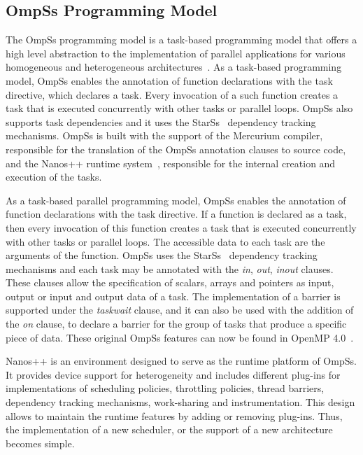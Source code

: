 {\subsection{OmpSs Programming Model}
The OmpSs programming model is a task-based programming model that offers a high level abstraction to the implementation of parallel applications for various homogeneous and heterogeneous architectures~\cite{OmpSs_PPL11,OmpSs}. 
As a task-based programming model, OmpSs enables the annotation of function declarations with the task directive, which declares a task. 
Every invocation of a such function creates a task that is executed concurrently with other tasks or parallel loops. 
OmpSs also supports task dependencies and it uses the StarSs~\cite{StarSs} dependency tracking mechanisms. 
OmpSs is built with the support of the Mercurium compiler, responsible for the translation of the OmpSs annotation clauses to source code, and the Nanos++ runtime system~\cite{nanos}, responsible for the internal creation and execution of the tasks.

As a task-based parallel programming model, OmpSs enables the annotation of function declarations with the task directive. 
If a function is declared as a task, then every invocation of this function creates a task that is executed concurrently with other tasks or parallel loops. 
The accessible data to each task are the arguments of the function. 
OmpSs uses the StarSs~\cite{StarSs} dependency tracking mechanisms and each task may be annotated with the \textit{in}, \textit{out}, \textit{inout} clauses. 
These clauses allow the specification of scalars, arrays and pointers as input, output or input and output data of a task. 
The implementation of a barrier is supported under the \textit{taskwait} clause, and it can also be used with the addition of the \textit{on} clause, to declare a barrier for the group of tasks that produce a specific piece of data. 
These original OmpSs features can now be found in OpenMP 4.0~\cite{OpenMP}.

Nanos++ is an environment designed to serve as the runtime platform of OmpSs. 
It provides device support for heterogeneity and includes different plug-ins for implementations of scheduling policies, throttling policies, thread barriers, dependency tracking mechanisms, work-sharing and instrumentation. 
This design allows to maintain the runtime features by adding or removing plug-ins. 
Thus, the implementation of a new scheduler, or the support of a new architecture becomes simple.

}
